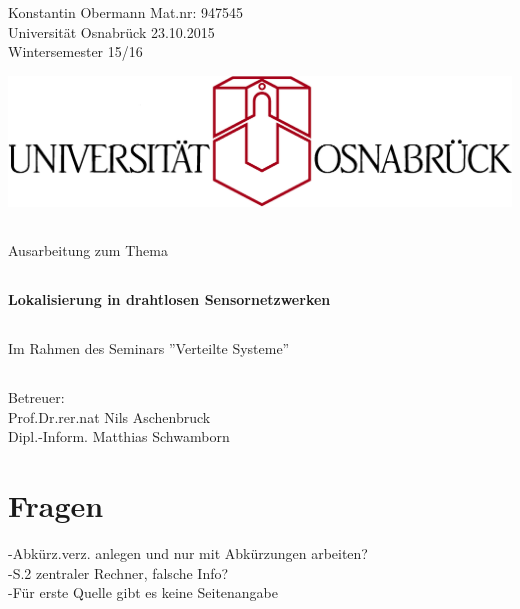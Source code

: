 \documentclass[12pt, a4wide]{scrreprt}
\begin{document}
\noindent
Konstantin Obermann \hfill Mat.nr: 947545\\
Universität Osnabrück \hfill 23.10.2015\\
Wintersemester 15/16\\
\thispagestyle{empty}
\begin{center}
\includegraphics[scale=.9]{uos_proper.png}
\section*{}
{\LARGE Ausarbeitung zum Thema}\\
\section*{}
{\Huge {\bf Lokalisierung in drahtlosen Sensornetzwerken}}\\
\section*{}
{\Large Im Rahmen des Seminars ''Verteilte Systeme''}\\
\section*{}
{\Large Betreuer:}\\
{\Large Prof.Dr.rer.nat Nils Aschenbruck}\\
{\Large Dipl.-Inform. Matthias Schwamborn}\\
\end{center}

\newpage
\chapter*{Fragen}
\thispagestyle{empty}
-Abkürz.verz. anlegen und nur mit Abkürzungen arbeiten?\\
-S.2 zentraler Rechner, falsche Info?\\
-Für erste Quelle gibt es keine Seitenangabe\\
\end{document}
